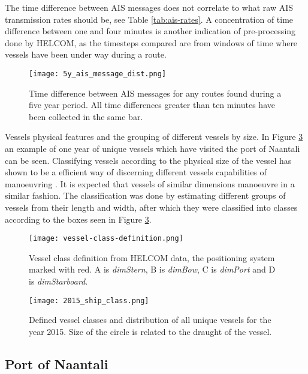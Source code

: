 \documentclass[../main.tex]{subfiles}
\begin{document}
The time difference between AIS messages does not correlate to what raw AIS transmission rates should be, see Table \ref{tab:ais-rates}. A concentration of time difference between one and four minutes is another indication of pre-processing done by HELCOM, as the timesteps compared are from windows of time where vessels have been under way during a route.

\begin{figure}[H]
	\centering
	\texttt{[image: 5y\_ais\_message\_dist.png]}
	\caption{Time difference between AIS messages for any routes found during a five year period. All time differences greater than ten minutes have been collected in the same bar.}
	\label{fig:ais-msg-dist}
\end{figure}


Vessels physical features and the grouping of different vessels by size. In Figure \ref{fig:vessel-classes} an example of one year of unique vessels which have visited the port of Naantali can be seen. Classifying vessels according to the physical size of the vessel has shown to be a efficient way of discerning different vessels capabilities of manoeuvring \cite{Jahn_2018}. It is expected that vessels of similar dimensions manoeuvre in a similar fashion. The classification was done by estimating different groups of vessels from their length and width, after which they were classified into classes according to the boxes seen in Figure \ref{fig:vessel-classes}.

\begin{figure}[H]
	\centering
	\texttt{[image: vessel-class-definition.png]}
	\caption{Vessel class definition from HELCOM data, the positioning system marked with red. A is \textit{dimStern}, B is \textit{dimBow}, C is \textit{dimPort} and D is \textit{dimStarboard}.}
	\label{fig:vessel-class-def}
\end{figure}

\begin{figure}[H]
	\centering
	\texttt{[image: 2015\_ship\_class.png]}
	\caption{Defined vessel classes and distribution of all unique vessels for the year 2015. Size of the circle is related to the draught of the vessel.}
	\label{fig:vessel-classes}
\end{figure}


\subsection{Port of Naantali}
\end{document}
